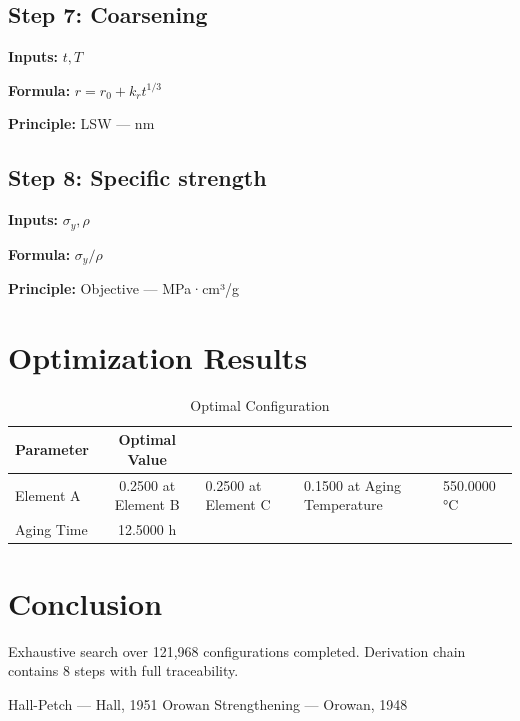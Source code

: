 \documentclass[11pt,twocolumn]{article}
\begin{document}
\subsection*{Step 7: Coarsening}
\textbf{Inputs:} $t, T$

\textbf{Formula:} $r = r_0 + k_r t^{1/3}$

\textbf{Principle:} LSW --- nm

\subsection*{Step 8: Specific strength}
\textbf{Inputs:} $\sigma_y, \rho$

\textbf{Formula:} $\sigma_y/\rho$

\textbf{Principle:} Objective --- MPa·cm³/g


\section{Optimization Results}
\begin{table}[h]
\centering
\caption{Optimal Configuration}
\begin{tabular}{@{}lc@{}}
\toprule
Parameter & Optimal Value \\
\midrule
Element A & 0.2500 at%
Element B & 0.2500 at%
Element C & 0.1500 at%
Aging Temperature & 550.0000 °C \\
Aging Time & 12.5000 h \\
\bottomrule
\end{tabular}
\end{table}

\section{Conclusion}
Exhaustive search over 121,968 configurations completed.
Derivation chain contains 8 steps with full traceability.

\begin{thebibliography}{9}
 Hall-Petch --- Hall, 1951
 Orowan Strengthening --- Orowan, 1948
\end{thebibliography}
\end{document}

